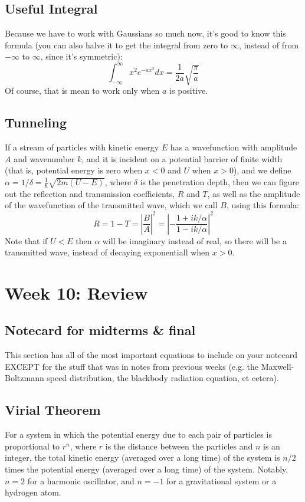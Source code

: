 \documentclass[12pt]{article}
\begin{document}
\subsection{Useful Integral}
Because we have to work with Gaussians so much now, it's good to know this formula (you can also halve it to get the integral from zero to $\infty$, instead of from $-\infty$ to $\infty$, since it's symmetric):
\[ \int_{-\infty}^\infty x^2 e^{-ax^2} dx = \frac{1}{2a} \sqrt{ \frac{\pi}{a} } \]
Of course, that is mean to work only when $a$ is positive.

\subsection{Tunneling}
If a stream of particles with kinetic energy $E$ has a wavefunction with amplitude $A$ and wavenumber $k$, and it is incident on a potential barrier of finite width (that is, potential energy is zero when $x<0$ and $U$ when $x>0$), and we define $\alpha = 1/\delta = \frac{1}{\hbar} \sqrt{2m(U-E)}$, where $\delta$ is the penetration depth, then we can figure out the reflection and transmission coefficients, $R$ and $T$, as well as the amplitude of the wavefunction of the transmitted wave, which we call $B$, using this formula:
\[ R = 1 - T = \left| \frac{B}{A} \right|^2 = \left| - \frac{1 + ik / \alpha}{1 - ik / \alpha} \right|^2 \]
Note that if $U<E$ then $\alpha$ will be imaginary instead of real, so there will be a transmitted wave, instead of decaying exponentiall when $x>0$.

\section{Week 10: Review}

\subsection{Notecard for midterms \& final}
This section has all of the most important equations to include on your notecard EXCEPT for the stuff that was in notes from previous weeks (e.g. the Maxwell-Boltzmann speed distribution, the blackbody radiation equation, et cetera).

\subsection{Virial Theorem}
For a system in which the potential energy due to each pair of particles is proportional to $r^n$, where $r$ is the distance between the particles and $n$ is an integer, the total kinetic energy (averaged over a long time) of the system is $n/2$ times the potential energy (averaged over a long time) of the system. Notably, $n=2$ for a harmonic oscillator, and $n=-1$ for a gravitational system or a hydrogen atom.
\end{document}
